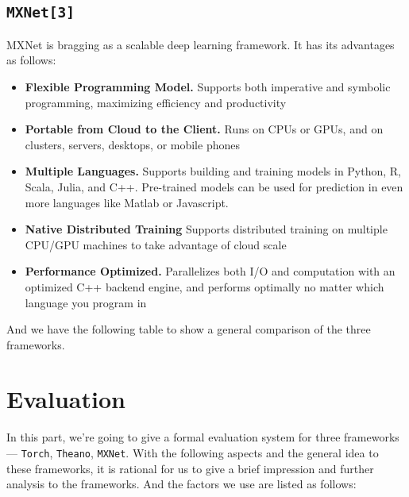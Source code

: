 \documentclass[12pt]{article}
\begin{document}
\subsection{\texttt{MXNet[3]}}
MXNet is bragging as a scalable deep learning framework. It has its advantages as follows:
\begin{itemize}	
	\item {\bf Flexible Programming Model.} Supports both imperative and symbolic programming, maximizing efficiency and productivity
	\item {\bf Portable from Cloud to the Client.} Runs on CPUs or GPUs, and on clusters, servers, desktops, or mobile phones 
	\item {\bf Multiple Languages.} Supports building and training models in Python, R, Scala, Julia, and C++. Pre-trained models can be used for prediction in even more languages like Matlab or Javascript.
	\item {\bf Native Distributed Training} Supports distributed training on multiple CPU/GPU machines to take advantage of cloud scale
	\item {\bf Performance Optimized.} Parallelizes both I/O and computation with an optimized C++ backend engine, and performs optimally no matter which language you program in
\end{itemize}
And we have the following table to show a general comparison of the three frameworks.


\section{Evaluation}
In this part, we're going to give a formal evaluation system for three frameworks --- \texttt{Torch}, \texttt{Theano}, \texttt{MXNet}. With the following aspects and the general idea to these frameworks, it is rational for us to give a brief impression and further analysis to the frameworks. And the factors we use are listed as follows:
\end{document}
